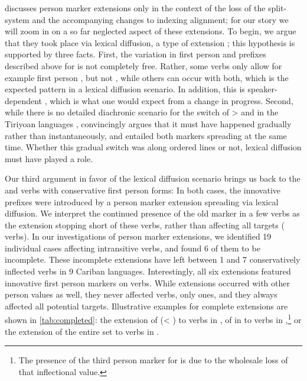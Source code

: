 
\textcite{gildea1998} discusses person marker extensions only in the context of the loss of the split- system and the accompanying changes to indexing alignment; for our story we will zoom in on a so far neglected aspect of these extensions.
To begin, we argue that they took place via lexical diffusion, a type of extension \parencite[106--115]{harris1995historical}; this hypothesis is supported by three facts.
First, the variation in first person and  prefixes described above for \kaxui is not completely free.
Rather, some verbs only allow for example first person , but not , while others can occur with both, which is the expected pattern in a lexical diffusion scenario.
In addition, this is speaker-dependent , which is what one would expect from a change in progress.
Second, while there is no detailed diachronic scenario for the switch of >  and  in the Tiriyoan languages , \textcite[111--112]{meira1998proto} convincingly argues that it must have happened gradually rather than instantaneously, and entailed both markers spreading at the same time.
Whether this gradual switch was along ordered lines or not, lexical diffusion must have played a role.

Our third argument in favor of the lexical diffusion scenario brings us back to the \hixka and \trio verbs with conservative first person forms:
In both cases, the innovative  prefixes were introduced by a person marker extension spreading via lexical diffusion.
We interpret the continued presence of the old  marker in a few verbs as the extension stopping short of these verbs, rather than affecting all targets ( verbs).
In our investigations of person marker extensions, we identified 19 individual cases affecting intransitive verbs, and found 6 of them to be incomplete.
These incomplete extensions have left between 1 and 7 conservatively inflected verbs in 9 Cariban languages. %
Interestingly, all six extensions featured innovative first person markers on  verbs.
While extensions occurred with other person values as well, they never affected  verbs, only  ones, and they always affected all potential targets.
Illustrative examples for complete extensions are shown in \cref{tab:completed}: the extension of   (< ) to  verbs in \apalai {}, of   in to  verbs in \panare {},\footnote{The presence of the third person marker  for  is due to the wholesale loss of that inflectional value.} or the extension of the entire  set to  verbs in \waimiri {}.%

